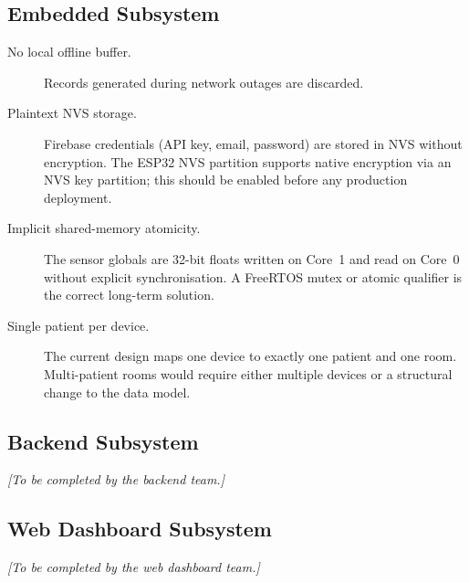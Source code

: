 \subsection{Embedded Subsystem}

\begin{description}
	\item[No local offline buffer.]
	      Records generated during network outages are discarded.

	\item[Plaintext NVS storage.]
	      Firebase credentials (API key, email, password) are stored in NVS without
	      encryption.
	      The ESP32 NVS partition supports native encryption via an NVS key partition;
	      this should be enabled before any production deployment.

	\item[Implicit shared-memory atomicity.]
	      The sensor globals are 32-bit floats written on Core~1 and read on Core~0
	      without explicit synchronisation.
	      A FreeRTOS mutex or atomic qualifier is the correct long-term solution.

	\item[Single patient per device.]
	      The current design maps one device to exactly one patient and one room.
	      Multi-patient rooms would require either multiple devices or a structural change
	      to the data model.
\end{description}

\subsection{Backend Subsystem}
\begin{center}
	\textit{[To be completed by the backend team.]}
\end{center}

\subsection{Web Dashboard Subsystem}
\begin{center}
	\textit{[To be completed by the web dashboard team.]}
\end{center}

